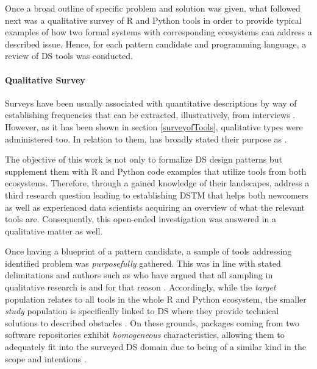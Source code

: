 Once a broad outline of specific problem and solution was given, what followed next was a qualitative survey of R and Python tools in order to provide typical examples of how two formal systems with corresponding ecosystems can address a described issue. 
Hence, for each pattern candidate and programming language, a review of \ac{DS} tools was conducted.

\paragraph*{Qualitative Survey} 
\label{collectionOfTools}
Surveys have been usually associated with quantitative descriptions  by way of establishing frequencies that can be extracted, illustratively, from interviews \parencite{JansenHarrie2010}. 
However, as it has been shown in section \ref{surveyofTools}, qualitative types were administered too. 
In relation to them, \textcite{JansenHarrie2010} has broadly stated their purpose as . 

The objective of this work is not only to formalize \ac{DS} design patterns but supplement them with R and Python code examples that utilize tools from both ecosystems. 
Therefore, through a gained knowledge of their landscapes, address a third research question leading to establishing \ac{DSTM} that helps both newcomers as well as experienced data scientists acquiring an overview of what the relevant tools are.
Consequently, this open-ended investigation was answered in a qualitative matter as well.

Once having a blueprint of a pattern candidate, a sample of tools addressing identified problem was \emph{purposefully} gathered.
This was in line with stated delimitations and authors such as \textcites{PattonMQ1990}{MargSade1995} who have argued that all sampling in qualitative research is  and for that reason  \parencites[80]{Charles2007}{JAN:JAN623}.
Accordingly, while the \emph{target} population relates to all tools in the whole R and Python ecosystem, the smaller \emph{study} population is specifically linked to \ac{DS} where they provide technical solutions to described obstacles \parencite{Hajimia2014}.
On these grounds, packages coming from two software repositories exhibit \emph{homogeneous} characteristics, allowing them to adequately fit into the surveyed \ac{DS} domain due to being of a similar kind in the scope and intentions \parencites{Hajimia2014}{SuriHarsh11}{Persson2004}.

